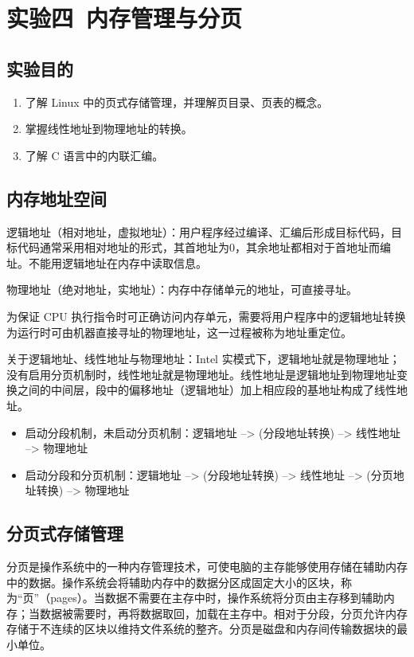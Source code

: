 \section{实验四\ 内存管理与分页}

\subsection{实验目的}

\begin{enumerate}
    \item 了解 Linux 中的页式存储管理，并理解页目录、页表的概念。
    \item 掌握线性地址到物理地址的转换。
    \item 了解 C 语言中的内联汇编。
\end{enumerate}

\subsection{内存地址空间}

逻辑地址（相对地址，虚拟地址）：用户程序经过编译、汇编后形成目标代码，目标代码通常采用相对地址的形式，其首地址为0，其余地址都相对于首地址而编址。不能用逻辑地址在内存中读取信息。

物理地址（绝对地址，实地址）：内存中存储单元的地址，可直接寻址。

为保证 CPU 执行指令时可正确访问内存单元，需要将用户程序中的逻辑地址转换为运行时可由机器直接寻址的物理地址，这一过程被称为地址重定位。

关于逻辑地址、线性地址与物理地址：Intel 实模式下，逻辑地址就是物理地址；没有启用分页机制时，线性地址就是物理地址。线性地址是逻辑地址到物理地址变换之间的中间层，段中的偏移地址（逻辑地址）加上相应段的基地址构成了线性地址。

\begin{itemize}
    \item 启动分段机制，未启动分页机制：逻辑地址 --> (分段地址转换) --> 线性地址 --> 物理地址
    \item 启动分段和分页机制：逻辑地址 --> (分段地址转换) --> 线性地址 --> (分页地址转换) --> 物理地址
\end{itemize}

\subsection{分页式存储管理}

分页是操作系统中的一种内存管理技术，可使电脑的主存能够使用存储在辅助内存中的数据。操作系统会将辅助内存中的数据分区成固定大小的区块，称为“页”（pages）。当数据不需要在主存中时，操作系统将分页由主存移到辅助内存；当数据被需要时，再将数据取回，加载在主存中。相对于分段，分页允许内存存储于不连续的区块以维持文件系统的整齐。分页是磁盘和内存间传输数据块的最小单位。

